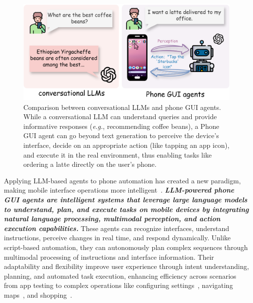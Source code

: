 \begin{figure}[ht]
    \centering
    \includegraphics[width=0.99\linewidth]{figures/llm_vs_agent.drawio.png}
    \caption{Comparison between conversational LLMs and phone GUI agents. While a conversational LLM can understand queries and provide informative responses (\textit{e.g.}, recommending coffee beans), a Phone GUI agent can go beyond text generation to perceive the device's interface, decide on an appropriate action (like tapping an app icon), and execute it in the real environment, thus enabling tasks like ordering a latte directly on the user's phone.}
    \label{fig:llm_vs_agent}
\end{figure}

Applying LLM-based agents to phone automation has created a new paradigm, making mobile interface operations more intelligent~\cite{hong2024cogagent,zheng2024gpt,zhang2023appagent,song2023navigating}. \textbf{\textit{LLM-powered phone GUI agents are intelligent systems that leverage large language models to understand, plan, and execute tasks on mobile devices by integrating natural language processing, multimodal perception, and action execution capabilities.}} These agents can recognize interfaces, understand instructions, perceive changes in real time, and respond dynamically. Unlike script-based automation, they can autonomously plan complex sequences through multimodal processing of instructions and interface information. Their adaptability and flexibility improve user experience through intent understanding, planning, and automated task execution, enhancing efficiency across scenarios from app testing to complex operations like configuring settings~\cite{wen2024autodroid}, navigating maps~\cite{wang2024mobileagentv1,wang2024mobileagentv2}, and shopping~\cite{zhang2023appagent}.


